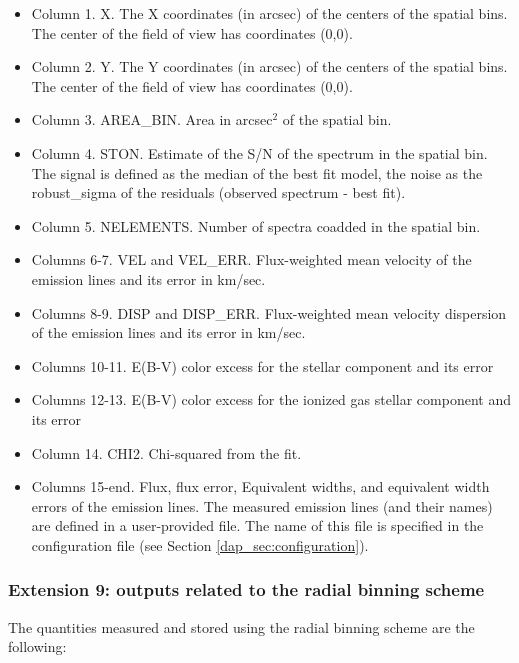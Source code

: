 \begin{itemize}

\item Column 1. X. The X coordinates (in arcsec) of the centers of the spatial bins. The center of the field of view has coordinates (0,0).
\item Column 2. Y. The Y coordinates (in arcsec) of the centers of the spatial bins. The center of the field of view has coordinates (0,0).
\item Column 3. AREA\_BIN. Area in arcsec$^2$ of the spatial bin.
\item Column 4. STON. Estimate of the S/N of the spectrum in the
  spatial bin. The signal is defined as the median of the best fit
  model, the noise as the robust\_sigma of the residuals (observed
  spectrum - best fit).
\item Column 5. NELEMENTS. Number of spectra coadded in the spatial bin.
\item Columns 6-7. VEL and VEL\_ERR. Flux-weighted mean velocity of the emission lines and its error in km/sec.
\item Columns 8-9. DISP and DISP\_ERR. Flux-weighted mean velocity dispersion of the emission lines and its error in km/sec.
\item Columns 10-11. E(B-V) color excess for the stellar component and its error
\item Columns 12-13. E(B-V) color excess for the ionized gas stellar component and its error
\item Column 14.  CHI2. Chi-squared from the fit.
\item Columns 15-end. Flux, flux error, Equivalent widths, and
  equivalent width errors of the emission lines.  The measured
  emission lines (and their names) are defined in a user-provided
  file. The name of this file is specified in the configuration file
  (see Section \ref{dap_sec:configuration}).
\end{itemize}

\subsubsection{Extension 9: outputs related to the radial binning
  scheme} 


The quantities measured and stored using the radial binning scheme are
the following:

